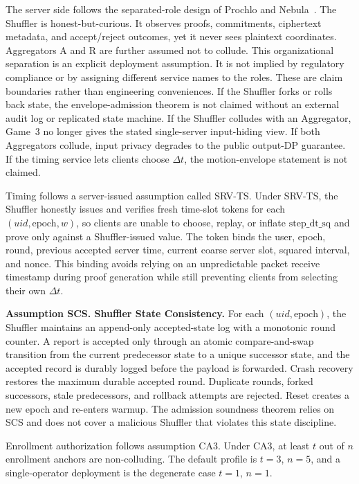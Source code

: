 \documentclass[journal]{IEEEtran}
\theoremstyle{definition}
\theoremstyle{plain}
\begin{document}
The server side follows the separated-role design of Prochlo and
Nebula~\cite{Bittau2017Prochlo,Shamsabadi2025Nebula}. The Shuffler is
honest-but-curious. It observes proofs, commitments, ciphertext metadata, and
accept/reject outcomes, yet it never sees plaintext coordinates. Aggregators A
and R are further assumed not to collude. This organizational separation is an
explicit deployment assumption. It is not implied by regulatory compliance or
by assigning different service names to the roles.
These are claim boundaries rather than engineering conveniences. If the
Shuffler forks or rolls back state, the envelope-admission theorem is not
claimed without an external audit log or replicated state machine. If the
Shuffler colludes with an Aggregator, Game~3 no longer gives the stated
single-server input-hiding view. If both Aggregators collude, input privacy
degrades to the public output-DP guarantee. If the timing service lets clients
choose \(\Delta t\), the motion-envelope statement is not claimed.

Timing follows a server-issued assumption called SRV-TS. Under SRV-TS, the
Shuffler honestly issues and verifies fresh time-slot tokens for each
$(uid,\mathrm{epoch},w)$, so clients are unable to choose, replay, or inflate
$\mathrm{step\_dt\_sq}$ and prove only against a Shuffler-issued value. The token
binds the user, epoch, round, previous accepted server time, current coarse
server slot, squared interval, and nonce. This binding avoids relying on an
unpredictable packet receive timestamp during proof generation while still
preventing clients from selecting their own $\Delta t$.

\noindent\textbf{Assumption SCS. Shuffler State Consistency.}
For each \((uid,\mathrm{epoch})\), the Shuffler maintains an append-only
accepted-state log with a monotonic round counter. A report is accepted only
through an atomic compare-and-swap transition from the current predecessor state
to a unique successor state, and the accepted record is durably logged before
the payload is forwarded. Crash recovery restores the maximum durable accepted
round. Duplicate rounds, forked successors, stale predecessors, and rollback
attempts are rejected. Reset creates a new epoch and re-enters warmup. The
admission soundness theorem relies on SCS and does not cover a malicious
Shuffler that violates this state discipline.

Enrollment authorization follows assumption CA3. Under CA3, at least $t$ out of
$n$ enrollment anchors are non-colluding. The default profile is $t=3$, $n=5$,
and a single-operator deployment is the degenerate case $t=1$, $n=1$.
\end{document}
